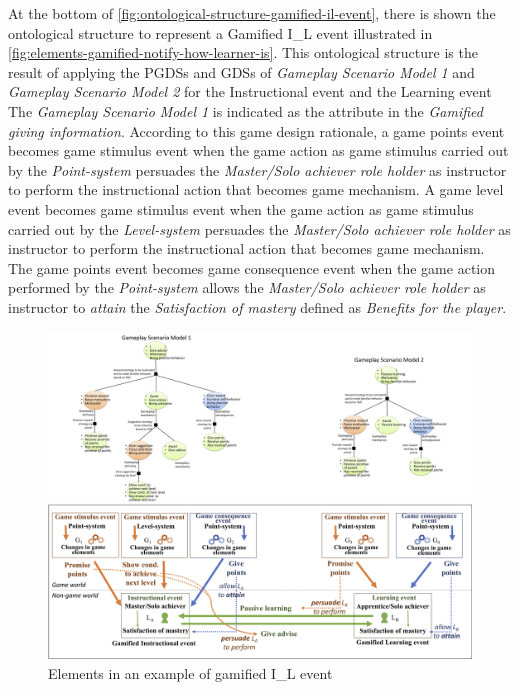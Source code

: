 At the bottom of \autoref{fig:ontological-structure-gamified-il-event}, there is shown the ontological structure to represent a Gamified I\_L event  illustrated in \autoref{fig:elements-gamified-notify-how-learner-is}.
This ontological structure is the result of applying the PGDSs and GDSs of \emph{Gameplay Scenario Model 1} and \emph{Gameplay Scenario Model 2} for the Instructional event  and the Learning event 
The \emph{Gameplay Scenario Model 1} is indicated as the attribute  in the \emph{Gamified giving information}. 
According to this game design rationale, a game points event becomes game stimulus event when the game action  as game stimulus carried out by the \emph{Point-system} persuades the \emph{Master/Solo achiever role holder} as instructor to perform the instructional action  that becomes game mechanism.
A game level event becomes game stimulus event when the game action  as game stimulus carried out by the \emph{Level-system} persuades the \emph{Master/Solo achiever role holder} as instructor to perform the instructional action  that becomes game mechanism.
The game points event becomes game consequence event when the game action  performed by the \emph{Point-system} allows the \emph{Master/Solo achiever role holder} as instructor to \emph{attain} the \emph{Satisfaction of mastery} defined as \emph{Benefits for the player}.

\begin{figure}[!htbp]
 \caption[Elements in the example of gamified I\_L event ]{Elements in an example of gamified I\_L event }
 \label{fig:elements-gamified-notify-how-learner-is}
 \centering
 \includegraphics[width=1\textwidth]{images/chap-ontogacles2/elements-gamified-notify-how-learner-is.png}
 \fautor
\end{figure}

